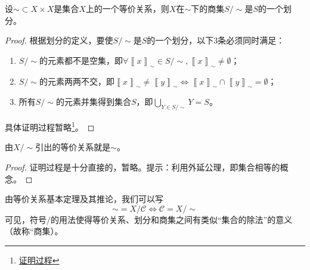 \documentclass[../main.tex]{subfiles}
\begin{document}
\begin{theorem}[等价关系基本定理]\label{thm:II.1.1}
    设$\sim\subset X\times X$是集合$X$上的一个等价关系，则$X$在$\sim$下的商集$S/\sim$是$S$的一个划分。
\end{theorem}
\begin{proof}
    根据划分的定义，要使$S/\sim$是$S$的一个划分，以下3条必须同时满足：
    \begin{enumerate}
        \item $S/\sim$的元素都不是空集，即$\forall\left\llbracket x\right\rrbracket_\sim\in S/\sim,\left\llbracket x\right\rrbracket_\sim\neq\emptyset$；
        \item $S/\sim$的元素两两不交，即$\left\llbracket x\right\rrbracket_\sim\neq\left\llbracket y\right\rrbracket_\sim\Leftrightarrow\left\llbracket x\right\rrbracket_\sim\cap\left\llbracket y\right\rrbracket_\sim=\emptyset$；
        \item 所有$S/\sim$的元素并集得到集合$S$，即$\bigcup_{Y\in S/\sim}Y=S$。
    \end{enumerate}
    具体证明过程暂略\footnote{\href{https://proofwiki.org/wiki/Fundamental_Theorem_on_Equivalence_Relations}{证明过程}}。
\end{proof}
\begin{corollary}
    由$X/\sim$引出的等价关系就是$\sim$。
\end{corollary}
\begin{proof}
    证明过程是十分直接的，暂略。提示：利用外延公理，即集合相等的概念。
\end{proof}

由等价关系基本定理及其推论，我们可以写
\[
    \sim=X/\mathcal{C}\Leftrightarrow \mathcal{C}=X/\sim
\]
可见，符号$/$的用法使得等价关系、划分和商集之间有类似“集合的除法”的意义（故称“商集）。
\end{document}
